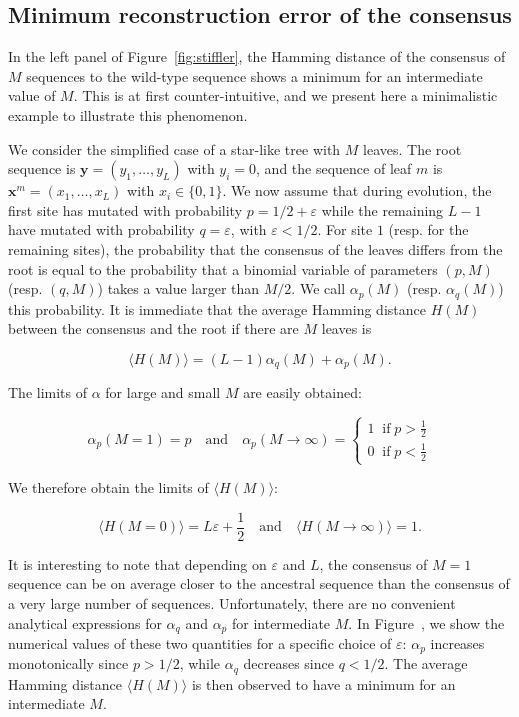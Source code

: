 \subsection{Minimum reconstruction error of the consensus} %
\label{sub:minimum_reconstruction_error_of_the_consensus}

In the left panel of Figure~\ref{fig:stiffler}, the Hamming distance of the consensus of $M$ sequences to the wild-type sequence shows a minimum for an intermediate value of $M$. 
This is at first counter-intuitive, and we present here a minimalistic example to illustrate this phenomenon. 

We consider the simplified case of a star-like tree with $M$ leaves. 
The root sequence is $\mathbf{y}=(y_1,\ldots,y_L)$ with $y_i=0$, and the sequence of leaf $m$ is $\mathbf{x}^m = (x_1,\ldots,x_L)$ with $x_i \in \{0, 1\}$. 
We now assume that during evolution, the first site has mutated with probability $p = 1/2 + \varepsilon$ while the remaining $L-1$ have mutated with probability $q = \varepsilon$, with $\varepsilon < 1/2$. 
For site $1$ (resp. for the remaining sites), the probability that the consensus of the leaves differs from the root is equal to the probability that a binomial variable of parameters $(p, M)$ (resp. $(q, M)$) takes a value larger than $M/2$. 
We call $\alpha_p(M)$ (resp. $\alpha_q(M)$) this probability. 
It is immediate that the average Hamming distance $H(M)$ between the consensus and the root if there are $M$ leaves is 

$$ \langle H(M) \rangle = (L-1)\alpha_q(M) + \alpha_p(M). $$

The limits of $\alpha$ for large and small $M$ are easily obtained: 

$$ 
\alpha_p(M=1) = p 
\quad \text{and} \quad 
\alpha_p(M\rightarrow\infty) = \begin{cases} 
	1 \;\;\text{if}\; p > \frac{1}{2}\\
	0 \;\;\text{if}\; p < \frac{1}{2}
\end{cases}
$$

We therefore obtain the limits of $\langle H(M) \rangle$: 

$$ \langle H(M=0) \rangle = L \varepsilon + \frac{1}{2} 
\quad\text{and}\quad 
\langle H(M\rightarrow \infty) \rangle = 1.
$$

It is interesting to note that depending on $\varepsilon$ and $L$, the consensus of $M=1$ sequence can be on average closer to the ancestral sequence than the consensus of a very large number of sequences. 
Unfortunately, there are no convenient analytical expressions for $\alpha_q$ and $\alpha_p$ for intermediate $M$. 
In Figure~, we show the numerical values of these two quantities for a specific choice of $\varepsilon$: $\alpha_p$ increases monotonically since $p > 1/2$, while $\alpha_q$ decreases since $q < 1/2$. 
The average Hamming distance $\langle H(M) \rangle$ is then observed to have a minimum for an intermediate $M$. 

